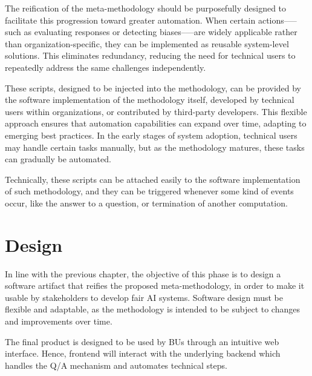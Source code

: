 \documentclass[12pt,a4paper,openright,twoside]{book}
\begin{document}
The reification of the meta-methodology should be purposefully designed to facilitate this progression toward greater automation. 
%
When certain actions--—such as evaluating responses or detecting biases--—are widely applicable rather than organization-specific, they can be implemented as reusable system-level solutions.
%
This eliminates redundancy, reducing the need for technical users to repeatedly address the same challenges independently.

These scripts, designed to be injected into the methodology, can be provided by the software implementation of the methodology itself, developed by technical users within organizations, or contributed by third-party developers.
%
This flexible approach ensures that automation capabilities can expand over time, adapting to emerging best practices.
%
In the early stages of system adoption, technical users may handle certain tasks manually, but as the methodology matures, these tasks can gradually be automated.

Technically, these scripts can be attached easily to the  software implementation of such methodology, and they can be triggered whenever some kind of events occur, like the answer to a question, or termination of another computation.






\chapter{Design}%
\label{chap:design}

In line with the previous chapter, the objective of this phase is to design a software artifact that reifies the proposed meta-methodology, in order to make it usable by stakeholders to develop fair \ac{AI} systems.
%
Software design must be flexible and adaptable, as the methodology is intended to be subject to changes and improvements over time.

The final product is designed to be used by \acfp{BU} through an intuitive web interface.
%
Hence, frontend will interact with the underlying backend which handles the \ac{Q/A} mechanism and automates technical steps.
\end{document}
